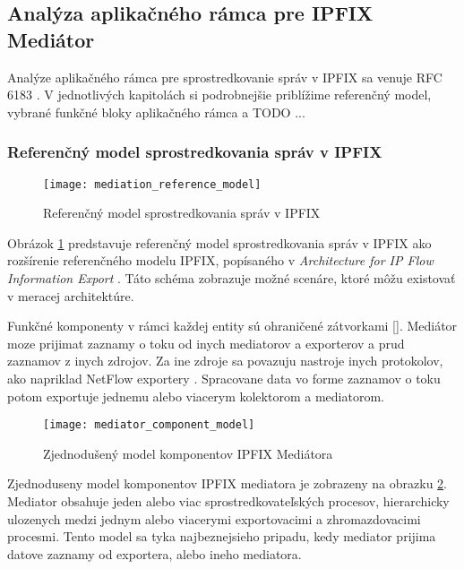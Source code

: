 \subsection{Analýza aplikačného rámca pre IPFIX Mediátor} \label{sec:framework}

Analýze aplikačného rámca pre sprostredkovanie správ v IPFIX sa venuje RFC 6183 \citep{rfc6183}. 
V jednotlivých kapitolách si podrobnejšie priblížime referenčný model, vybrané funkčné bloky 
aplikačného rámca a TODO ...

\subsubsection{Referenčný model sprostredkovania správ v IPFIX}

\begin{figure}[ht!]
\centering
\texttt{[image: mediation\_reference\_model]}
\caption{Referenčný model sprostredkovania správ v IPFIX}\label{o:mediation_reference_model}
\end{figure}

Obrázok \ref{o:mediation_reference_model} predstavuje referenčný model sprostredkovania správ v IPFIX 
ako rozšírenie referenčného modelu IPFIX, popísaného v \emph{Architecture for IP Flow Information Export} 
\citep{rfc5470}. Táto schéma zobrazuje možné scenáre, ktoré môžu existovať v meracej architektúre.

Funkčné komponenty v rámci každej entity sú ohraničené zátvorkami []. Mediátor moze prijimat 
zaznamy o toku od inych mediatorov a exporterov a prud zaznamov z inych zdrojov.
Za ine zdroje sa povazuju nastroje inych protokolov, ako napriklad NetFlow exportery \citep{rfc3954}. 
Spracovane data vo forme zaznamov o toku potom exportuje jednemu alebo viacerym kolektorom a mediatorom.

\begin{figure}[ht!]
\centering
\texttt{[image: mediator\_component\_model]}
\caption{Zjednodušený model komponentov IPFIX Mediátora}\label{o:mediator_component_model}
\end{figure}

Zjednoduseny model komponentov IPFIX mediatora je zobrazeny na obrazku \ref{o:mediator_component_model}. 
Mediator obsahuje jeden alebo viac sprostredkovateľských procesov, hierarchicky ulozenych 
medzi jednym alebo viacerymi exportovacimi a zhromazdovacimi procesmi. Tento model sa tyka 
najbeznejsieho pripadu, kedy mediator prijima datove zaznamy od exportera, alebo ineho mediatora.

